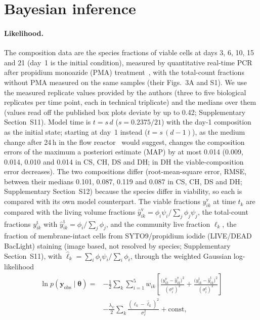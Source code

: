 \documentclass[preprint,12pt]{elsarticle}
\newcommand{\btheta}{\boldsymbol{\theta}}
\newcommand{\yobs}{\mathbf{y}_{\mathrm{obs}}}
\begin{document}
\section{Bayesian inference}
\label{sec:inference}

\paragraph{Likelihood.}
The composition data are the species fractions of viable cells at days 3, 6, 10, 15 and 21 (day~1 is the initial condition), measured by quantitative real-time PCR after propidium monoazide (PMA) treatment~\citep{heine2025influence}, with the total-count fractions without PMA measured on the same samples (their Figs.~3A and S1).
We use the measured replicate values provided by the authors (three to five biological replicates per time point, each in technical triplicate) and the medians over them (values read off the published box plots deviate by up to 0.42; Supplementary Section~S11).
Model time is $t=s\,d$ ($s=0.2375/21$) with the day-1 composition as the initial state; starting at day~1 instead ($t=s\,(d-1)$), as the medium change after 24\,h in the flow reactor~\citep{heine2025influence} would suggest, changes the composition errors of the maximum a posteriori estimate (MAP) by at most 0.014 (0.009, 0.014, 0.010 and 0.014 in CS, CH, DS and DH; in DH the viable-composition error decreases).
The two compositions differ (root-mean-square error, RMSE, between their medians 0.101, 0.087, 0.119 and 0.087 in CS, CH, DS and DH; Supplementary Section~S12) because the species differ in viability, so each is compared with its own model counterpart.
The viable fractions $y^{\mathrm{v}}_{ik}$ at time $t_k$ are compared with the living volume fractions $\hat y^{\mathrm{v}}_{ik}=\phi_i\psi_i/\sum_j\phi_j\psi_j$, the total-count fractions $y^{\mathrm{t}}_{ik}$ with $\hat y^{\mathrm{t}}_{ik}=\phi_i/\sum_j\phi_j$, and the community live fraction $\ell_k$, the fraction of membrane-intact cells from SYTO9/propidium iodide (LIVE/DEAD BacLight) staining (image based, not resolved by species; Supplementary Section~S11), with $\hat\ell_k=\sum_i\phi_i\psi_i/\sum_i\phi_i$, through the weighted Gaussian log-likelihood
\begin{equation}
\begin{split}
\ln p(\yobs\mid\btheta)={}&-\frac12\sum_{k}\sum_{i=1}^{5}w_{ik}\left[\frac{\bigl(y^{\mathrm{v}}_{ik}-\hat y^{\mathrm{v}}_{ik}\bigr)^2}{(\sigma^{\mathrm{v}}_{i})^2}+\frac{\bigl(y^{\mathrm{t}}_{ik}-\hat y^{\mathrm{t}}_{ik}\bigr)^2}{(\sigma^{\mathrm{t}}_{i})^2}\right]\\
&-\frac{\lambda_\psi}{2}\sum_k\frac{(\ell_k-\hat\ell_k)^2}{\sigma_\ell^2}+\mathrm{const},
\end{split}
\label{eq:lik}
\end{equation}
\end{document}
